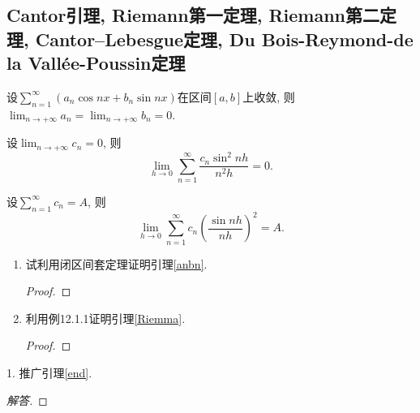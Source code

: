\subsection{Cantor引理, Riemann第一定理, Riemann第二定理, Cantor--Lebesgue定理, Du Bois-Reymond-de la Vall\'{e}e-Poussin定理}
\begin{lemma}[Cantor引理]\label{anbn}
设\(\sum_{n=1}^{\infty}\left(a_n\cos nx+b_n\sin nx\right)\)在区间\([a,b]\)上收敛, 
则\(\lim_{n\rightarrow+\infty}a_n=\lim_{n\rightarrow+\infty}b_n=0\).
\end{lemma}
\begin{lemma}[Riemann第二定理]\label{Riemma}
设\(\lim_{n\rightarrow+\infty}c_n=0\), 则\[\lim_{h\rightarrow 0}\sum_{n=1}^{\infty}\frac{c_n\sin^2nh}{n^2h}=0.\]
\end{lemma}
\begin{lemma}\label{end}
设\(\sum_{n=1}^{\infty}c_n=A\), 则\[\lim_{h\rightarrow 0}\sum_{n=1}^{\infty}c_n\left(\frac{\sin nh}{nh}\right)^2=A.\]
\end{lemma}
\begin{quiza}
\begin{enumerate}
\item 试利用闭区间套定理证明引理\ref{anbn}.
\begin{proof}

\end{proof}
\item 利用例12.1.1证明引理\ref{Riemma}.
\begin{proof}

\end{proof}
\end{enumerate}
\end{quiza}
\begin{quizb}
1. 推广引理\ref{end}.
\begin{proof}[解答]

\end{proof}
\end{quizb}